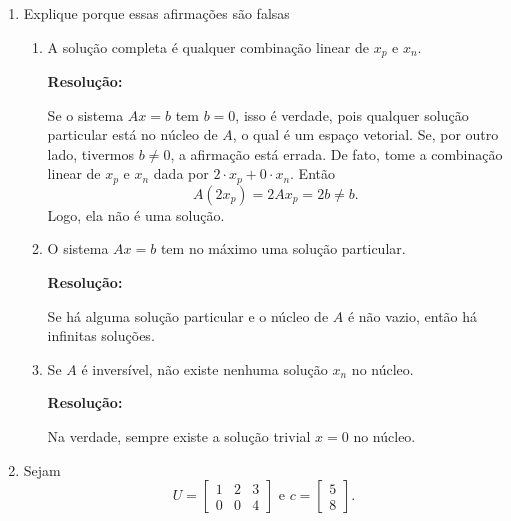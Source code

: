 \documentclass[leqno]{article}
\numberwithin{equation}{section}
\newenvironment{sol}
{
    \vspace{4mm}
    \noindent\textbf{Resolução:}
    \strut\newline
    \smallskip
    \hspace{-3.5mm}
}
{}
\begin{document}
\begin{enumerate}

    \item Explique porque essas afirmações são falsas

        \begin{enumerate}

            \item A solução completa é qualquer combinação linear de $x_p$ e $x_n$.

                \begin{sol} 
                    Se o sistema \( Ax = b \) tem \( b = 0 \), isso é verdade, pois qualquer solução particular está no núcleo de \( A \), o qual é um espaço vetorial.
                    Se, por outro lado, tivermos \( b \neq 0 \), a afirmação está errada.
                    De fato, tome a combinação linear de \( x_{ p } \) e \( x_{ n } \) dada por \( 2 \cdot x_{ p } + 0 \cdot x_{ n } \).
                    Então
                    \begin{equation*}
                        A ( 2x_{ p } ) = 2 Ax_{ p } = 2b \neq b
                    .\end{equation*}
                    Logo, ela não é uma solução.
                \end{sol} 

            \item O sistema $Ax = b$ tem no máximo uma solução particular.

                \begin{sol} 
                    Se há alguma solução particular e o núcleo de \( A \) é não vazio, então há infinitas soluções.
                \end{sol} 

            \item Se $A$ é inversível, não existe nenhuma solução $x_n$ no núcleo.

                \begin{sol} 
                    Na verdade, sempre existe a solução trivial \( x = 0 \) no núcleo.
                \end{sol} 

        \end{enumerate}

    \item Sejam
        $$U = \begin{bmatrix} 
            1 & 2 & 3 \\
            0 & 0 & 4
            \end{bmatrix} \mbox{ e } c = \begin{bmatrix} 
            5 \\
            8
        \end{bmatrix}.$$


\end{enumerate}
\end{document}
